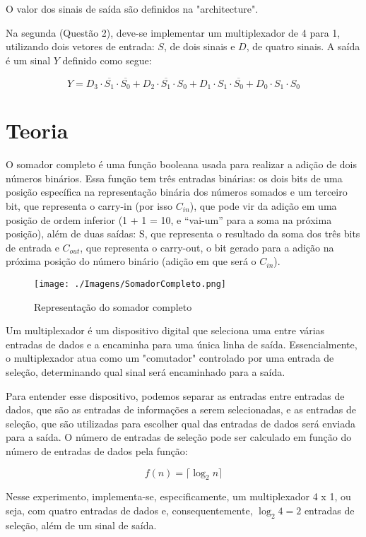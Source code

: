 \documentclass[a4paper,12pt]{article}
\begin{document}
\noindent O valor dos sinais de saída são definidos na "architecture".

Na segunda (Questão 2), deve-se implementar um multiplexador de 4 para 1, utilizando dois vetores de entrada: $S$, de dois sinais e $D$, de quatro sinais. A saída é um sinal $Y$ definido como segue:

\[
Y = D_3 \cdot \overline{S_1} \cdot \overline{S_0} + D_2 \cdot \overline{S_1} \cdot S_0 + D_1 \cdot S_1 \cdot \overline{S_0} + D_0 \cdot S_1 \cdot S_0
\]

\section{Teoria}
O somador completo é uma função booleana usada para realizar a adição de dois números binários. Essa função tem três entradas binárias: os dois bits de uma posição específica na representação binária dos números somados e um terceiro bit, que representa o carry-in (por isso $C_{in}$), que pode vir da adição em uma posição de ordem inferior (1 + 1 = 10, e “vai-um” para a soma na próxima posição), além de duas saídas: S, que representa o resultado da soma dos três bits de entrada e $C_{out}$, que representa o carry-out, o bit gerado para a adição na próxima posição do número binário (adição em que será o $C_{in}$).

\begin{figure}[H]
    \centering
    \texttt{[image: ./Imagens/SomadorCompleto.png]}
    \caption{Representação do somador completo}
\end{figure}

Um multiplexador é um dispositivo digital que seleciona uma entre várias entradas de dados e a encaminha para uma única linha de saída. Essencialmente, o multiplexador atua como um "comutador" controlado por uma entrada de seleção, determinando qual sinal será encaminhado para a saída.

Para entender esse dispositivo, podemos separar as entradas entre entradas de dados, que são as entradas de informações a serem selecionadas, e as entradas de seleção, que são utilizadas para escolher qual das entradas de dados será enviada para a saída. O número de entradas de seleção pode ser calculado em função do número de entradas de dados pela função: 

\[
f(n) = \lceil \log_2n \rceil
\]

Nesse experimento, implementa-se, especificamente, um multiplexador 4 x 1, ou seja, com quatro entradas de dados e, consequentemente, $\log_2 4 = 2$ entradas de seleção, além de um sinal de saída.
\end{document}
